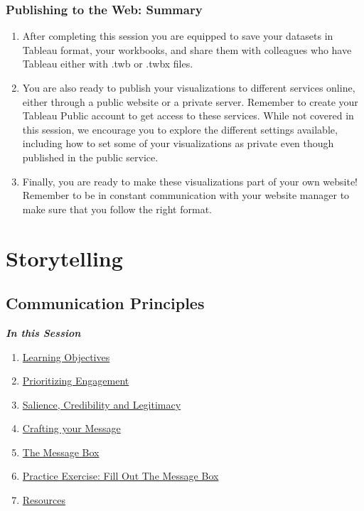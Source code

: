 \documentclass[
]{book}
\providecommand{\tightlist}{%
  \setlength{\itemsep}{0pt}\setlength{\parskip}{0pt}}
\begin{document}
\hypertarget{publishing-to-the-web-summary}{%
\subsection{Publishing to the Web: Summary}\label{publishing-to-the-web-summary}}

\begin{enumerate}
\def\labelenumi{\arabic{enumi}.}
\tightlist
\item
  After completing this session you are equipped to save your datasets in Tableau format, your workbooks, and share them with colleagues who have Tableau either with .twb or .twbx files.
\item
  You are also ready to publish your visualizations to different services online, either through a public website or a private server. Remember to create your Tableau Public account to get access to these services. While not covered in this session, we encourage you to explore the different settings available, including how to set some of your visualizations as private even though published in the public service.
\item
  Finally, you are ready to make these visualizations part of your own website! Remember to be in constant communication with your website manager to make sure that you follow the right format.
\end{enumerate}

\hypertarget{storytelling}{%
\chapter{Storytelling}\label{storytelling}}

\hypertarget{communication-principles}{%
\section{Communication Principles}\label{communication-principles}}

\textbf{\emph{In this Session}}

\begin{enumerate}
\def\labelenumi{\arabic{enumi}.}
\tightlist
\item
  \protect\hyperlink{communication-learning-objectives}{Learning Objectives}
\item
  \protect\hyperlink{prioritizing-engagement}{Prioritizing Engagement}
\item
  \protect\hyperlink{salience-credibility-and-legitimacy-cornerstones-of-effective-communication}{Salience, Credibility and Legitimacy}
\item
  \protect\hyperlink{crafting-your-message}{Crafting your Message}
\item
  \protect\hyperlink{the-message-box}{The Message Box}
\item
  \protect\hyperlink{practice-exercise-fill-out-the-message-box}{Practice Exercise: Fill Out The Message Box}
\item
  \protect\hyperlink{communication-resources}{Resources}
\end{enumerate}
\end{document}
